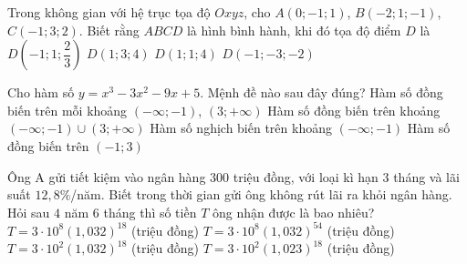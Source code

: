 \begin{ex}%
	Trong không gian với hệ trục tọa độ $Oxyz$, cho $A(0;-1;1)$, $B(-2;1;-1)$, $C(-1;3;2)$. Biết rằng $ABCD$ là hình bình hành, khi đó tọa độ điểm $D$ là
	\choice
	{$D\left(-1;1;\dfrac{2}{3}\right)$}
	{$D(1;3;4) $}
	{\True $D(1;1;4) $}
	{$D(-1;-3;-2)$}
\end{ex}
\begin{ex}%
	Cho hàm số $y=x^3-3x^2-9x+5$. Mệnh đề nào sau đây đúng?
	\choice
	{\True Hàm số đồng biến trên mỗi khoảng $(-\infty;-1)$,  $(3;+\infty)$}
	{Hàm số đồng biến trên khoảng $(-\infty;-1) \cup (3;+\infty)$}
	{Hàm số nghịch biến trên khoảng $(-\infty;-1)$}
	{Hàm số đồng biến trên $(-1;3)$}
\end{ex}
\begin{ex}%
Ông A gửi tiết kiệm vào ngân hàng $300$ triệu đồng, với loại kì hạn $3$ tháng và lãi suất $12{,}8 \%$/năm. Biết trong thời gian gửi ông không rút lãi ra khỏi ngân hàng. Hỏi sau $4$ năm $6$ tháng thì số tiền $T$ ông nhận được là bao nhiêu?
	\choice
	{$T=3\cdot 10^8(1{,}032)^{18}$ (triệu đồng)}
	{$T=3\cdot 10^8(1{,}032)^{54}$ (triệu đồng)}
	{\True $T=3\cdot 10^2(1{,}032)^{18}$ (triệu đồng)}
	{ $T=3\cdot 10^2(1{,}023)^{18}$ (triệu đồng)}
\end{ex}
